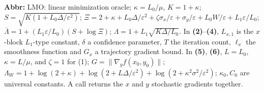 \begin{table}[tp]
\begin{threeparttable}
\begin{tablenotes}[flushleft]
\item[] \textbf{Abbr:} LMO: linear minimization oracle; $\kappa=L_0/\mu$, $K=1+\kappa$; $S=\sqrt{K(1+L_0\Delta/\varepsilon^2)}$; $\Xi=2+\kappa+L_0\Delta/\varepsilon^2+\zeta\sigma_x/\varepsilon+\sigma_y/\varepsilon+L_0W/\varepsilon+L_1\varepsilon/L_0$; $\bar\Lambda=1+(L_1\varepsilon/L_0)(S+\log\Xi)$; $\Lambda=1+L_1\sqrt{K\Delta/L_0}$. In \textbf{(2)}--\textbf{(4)}, $L_{x,1}$ is the $x$-block $L_1$-type constant, $\delta$ a confidence parameter, $T$ the iteration count, $\ell_x$ the smoothness function and $G_x$ a trajectory gradient bound. In \textbf{(5)}, \textbf{(6)}, $L=L_0$, $\kappa=L/\mu$, and $\zeta=1$ for (1); $G=\|\nabla_y f(x_0,y_0)\|$; $\Lambda_W=1+\log(2+\kappa)+\log(2+L\Delta/\varepsilon^2)+\log(2+\kappa^2\sigma^2/\varepsilon^2)$; $\kappa_0,C_0$ are universal constants. A call returns the $x$ and $y$ stochastic gradients together.
\end{tablenotes}
\end{threeparttable}
\end{table}
